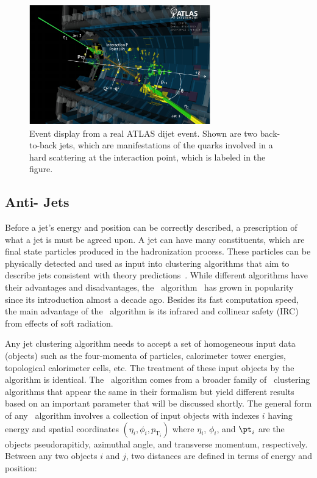 \begin{figure}
	\centering
	\includegraphics[width=0.7\textwidth]{figures/jets.pdf} 
	\caption{ Event display from a real ATLAS dijet event. Shown are two back-to-back jets, which are manifestations of the quarks involved in a hard scattering at the interaction point, which is labeled in the figure. }
	\label{fig:atlasjets}
\end{figure}


\subsection{\mbox{Anti-\kt} Jets} 
Before a jet's energy and position can be correctly described, a prescription of what a jet is must be agreed upon. A jet can have many constituents, which are final state particles produced in the hadronization process. These particles can be physically detected and used as input into clustering algorithms that aim to describe jets consistent with theory predictions~\cite{Ellis:1993tq,Dokshitzer:1997in,Wobisch:1998wt,Blazey:2000qt}. While different algorithms have their advantages and disadvantages, the \antikt\ algorithm~\cite{Cacciari:2008qp} has grown in popularity since its introduction almost a decade ago. Besides its fast computation speed, the main advantage of the \antikt\ algorithm is its infrared and collinear safety (IRC) from effects of soft radiation.

Any jet clustering algorithm needs to accept a set of homogeneous input data (objects) such as the four-momenta of particles, calorimeter tower energies, topological calorimeter cells, etc. The treatment of these input objects by the algorithm is identical. The \antikt\ algorithm comes from a broader family of \kt\ clustering algorithms that appear the same in their formalism but yield different results based on an important parameter that will be discussed shortly. The general form of any \kt\ algorithm involves a collection of input objects with indexes $i$ having energy and spatial coordinates $(\eta_{i}, \phi_{i}, p_{\mathrm{T}_{i}})$ where $\eta_{i}$, $\phi_{i}$, and $\pt_{i}$ are the objects pseudorapitidy, azimuthal angle, and transverse momentum, respectively. Between any two objects $i$ and $j$, two distances are defined in terms of energy and position:

